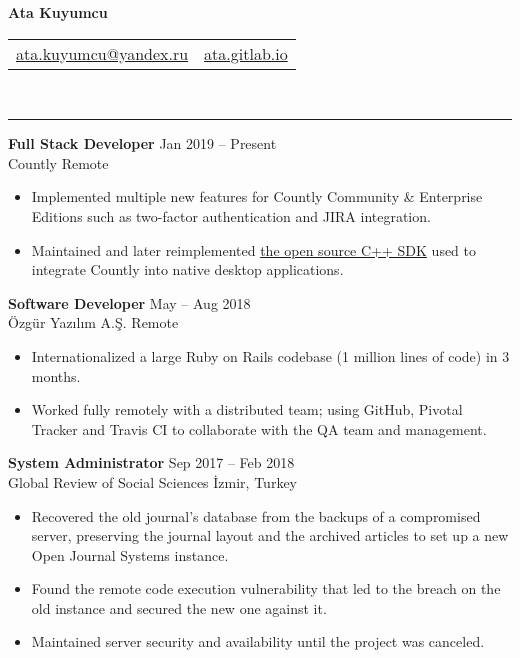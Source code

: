\documentclass[a4paper, 11pt]{article}
\newcommand{\resumeSection}[1]{\vspace{12pt}{\Large \bfseries #1} \vspace{-9pt} \\ \rule{\textwidth}{0.7pt}}
\newcommand{\resumeSubsection}[1]{\textbf{#1}}
\begin{document}
	\begin{center}
		{\huge \bfseries Ata Kuyumcu}

		\begin{tabular}{c c}
			\href{mailto:ata.kuyumcu@yandex.ru}{ata.kuyumcu@yandex.ru} &
			\href{https://ata.gitlab.io}{ata.gitlab.io}
			
		\end{tabular}
	\end{center}

	\vspace{-20pt}
	\resumeSection{Experience}
	
	\resumeSubsection{Full Stack Developer} \hfill Jan 2019  – Present \\
	Countly \hfill Remote
	
	\begin{itemize}
		\item Implemented multiple new features for Countly Community \& Enterprise Editions such as two-factor authentication and JIRA integration.
		\item Maintained and later reimplemented \href{https://github.com/Countly/countly-sdk-cpp}{the open source C++ SDK} used to integrate Countly into native desktop applications.
	\end{itemize}

	\resumeSubsection{Software Developer} \hfill May – Aug 2018 \\
	Özgür Yazılım A.Ş. \hfill Remote
		
	\begin{itemize}
		\item Internationalized a large Ruby on Rails codebase (1 million lines of code) in 3 months.
		\item Worked fully remotely with a distributed team; using GitHub, Pivotal Tracker and Travis CI to collaborate with the QA team and management.
	\end{itemize}

	\resumeSubsection{System Administrator} \hfill Sep 2017 – Feb 2018 \\
	Global Review of Social Sciences \hfill İzmir, Turkey

	\begin{itemize}
		\item Recovered the old journal’s database from the backups of a compromised server, preserving the journal layout and the archived articles to set up a new Open Journal Systems instance.
		\item Found the remote code execution vulnerability that led to the breach on the old instance and secured the new one against it.
		\item Maintained server security and availability until the project was canceled.
	\end{itemize}
	
\end{document}
